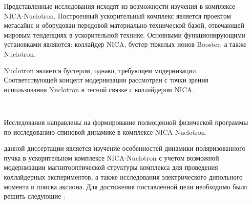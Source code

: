 \par Представленные исследования исходят из возможности изучения в комплексе NICA-Nuclotron. Построенный ускорительный комплекс является проектом мегасайнс и оборудован передовой материально-технической базой, отвечающей мировым тенденциях в ускорительной технике. Основными функционирующими установками являются: коллайдер NICA, бустер тяжелых ионов Booster, а также Nuclotron. 

\par Nuclotron является бустером, однако, требующем модернизации. Соответствующей концепт модернизации рассмотрен с точки зрения использования Nuclotron в тесной связке с коллайдером NICA. 

~\\
\par {\actuality} Исследования направлены на формирование полноценной физической программы по исследованию спиновой динамике в комплексе NICA-Nuclotron.
~\\
\par {\aim} данной диссертации является изучение 
особенностей динамики поляризованного пучка в ускорительном 
комплексе NICA-Nuclotron с учетом возможной модернизации 
магнитооптической структуры комплекса для проведения коллайдерных экспериментов, а также исследования 
электрического дипольного момента и поиска аксиона.
Для достижения поставленной цели необходимо было 
решить следующие {\tasks}:


